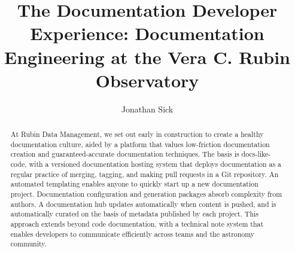 \documentclass[11pt,twoside]{article}
\begin{document}
\title{The Documentation Developer Experience: Documentation Engineering at the Vera C. Rubin Observatory}

\author{Jonathan Sick}





\begin{abstract}
At Rubin Data Management, we set out early in construction to create a healthy documentation culture, aided by a platform that values low-friction documentation creation and guaranteed-accurate documentation techniques.
The basis is docs-like-code, with a versioned documentation hosting system that deploys documentation as a regular practice of merging, tagging, and making pull requests in a Git repository.
An automated templating enables anyone to quickly start up a new documentation project.
Documentation configuration and generation packages absorb complexity from authors.
A documentation hub updates automatically when content is pushed, and is automatically curated on the basis of metadata published by each project.
This approach extends beyond code documentation, with a technical note system that enables developers to communicate efficiently across teams and the astronomy community.
\end{abstract}
\end{document}
